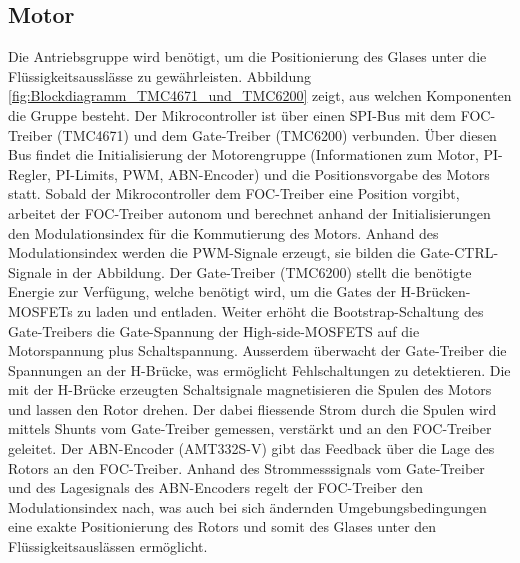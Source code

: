 \clearpage
\subsection{Motor}
\label{subsec:Motor}

Die Antriebsgruppe wird benötigt, um die Positionierung des Glases unter die Flüssigkeitsausslässe zu gewährleisten. Abbildung \ref{fig:Blockdiagramm_TMC4671_und_TMC6200} zeigt, aus welchen Komponenten die Gruppe besteht. Der Mikrocontroller ist über einen SPI-Bus mit dem FOC-Treiber (TMC4671) und dem Gate-Treiber (TMC6200) verbunden. Über diesen Bus findet die Initialisierung der Motorengruppe (Informationen zum Motor, PI-Regler, PI-Limits, PWM, ABN-Encoder) und die Positionsvorgabe des Motors statt. Sobald der Mikrocontroller dem FOC-Treiber eine Position vorgibt, arbeitet der FOC-Treiber autonom und berechnet anhand der Initialisierungen den Modulationsindex für die Kommutierung des Motors. Anhand des Modulationsindex werden die PWM-Signale erzeugt, sie bilden die Gate-CTRL-Signale in der Abbildung. Der Gate-Treiber (TMC6200) stellt die benötigte Energie zur Verfügung, welche benötigt wird, um die Gates der H-Brücken-MOSFETs zu laden und entladen. Weiter erhöht die Bootstrap-Schaltung des Gate-Treibers die Gate-Spannung der High-side-MOSFETS auf die Motorspannung plus Schaltspannung. Ausserdem überwacht der Gate-Treiber die Spannungen an der H-Brücke, was ermöglicht Fehlschaltungen zu detektieren. Die mit der H-Brücke erzeugten Schaltsignale magnetisieren die Spulen des Motors und lassen den Rotor drehen. Der dabei fliessende Strom durch die Spulen wird mittels Shunts vom Gate-Treiber gemessen, verstärkt und an den FOC-Treiber geleitet. Der ABN-Encoder (AMT332S-V) gibt das Feedback über die Lage des Rotors an den FOC-Treiber. Anhand des Strommesssignals vom Gate-Treiber und des Lagesignals des ABN-Encoders regelt der FOC-Treiber den Modulationsindex nach, was auch bei sich ändernden Umgebungsbedingungen eine exakte Positionierung des Rotors und somit des Glases unter den Flüssigkeitsauslässen ermöglicht.



